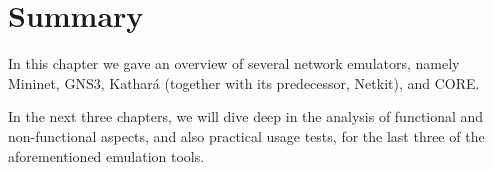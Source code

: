 \section{Summary}
\label{sec:exemulsummary}

In this chapter we gave an overview of several network emulators, namely Mininet, GNS3, Kathará (together with its predecessor, Netkit), and CORE.

In the next three chapters, we will dive deep in the analysis of functional and non-functional aspects, and also practical usage tests, for the last three of the aforementioned emulation tools.

